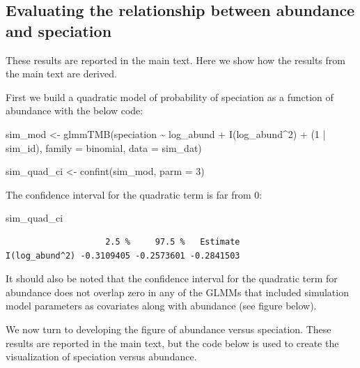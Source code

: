 \documentclass[
  letterpaper,
  DIV=11,
  numbers=noendperiod]{scrartcl}
\newenvironment{Shaded}{\begin{snugshade}}{\end{snugshade}}
\newcommand{\AttributeTok}[1]{\textcolor[rgb]{0.40,0.45,0.13}{#1}}
\newcommand{\DecValTok}[1]{\textcolor[rgb]{0.68,0.00,0.00}{#1}}
\newcommand{\FunctionTok}[1]{\textcolor[rgb]{0.28,0.35,0.67}{#1}}
\newcommand{\NormalTok}[1]{\textcolor[rgb]{0.00,0.23,0.31}{#1}}
\newcommand{\OtherTok}[1]{\textcolor[rgb]{0.00,0.23,0.31}{#1}}
\newcommand{\SpecialCharTok}[1]{\textcolor[rgb]{0.37,0.37,0.37}{#1}}
\begin{document}
\subsection{Evaluating the relationship between abundance and
speciation}\label{sec-sim-mod}

These results are reported in the main text. Here we show how the
results from the main text are derived.

First we build a quadratic model of probability of speciation as a
function of abundance with the below code:

\begin{Shaded}
\begin{Highlighting}[]
\NormalTok{sim\_mod }\OtherTok{\textless{}{-}} \FunctionTok{glmmTMB}\NormalTok{(speciation }\SpecialCharTok{\textasciitilde{}}\NormalTok{ log\_abund }\SpecialCharTok{+} \FunctionTok{I}\NormalTok{(log\_abund}\SpecialCharTok{\^{}}\DecValTok{2}\NormalTok{) }\SpecialCharTok{+}\NormalTok{ (}\DecValTok{1} \SpecialCharTok{|}\NormalTok{ sim\_id), }
                   \AttributeTok{family =}\NormalTok{ binomial, }\AttributeTok{data =}\NormalTok{ sim\_dat)}

\NormalTok{sim\_quad\_ci }\OtherTok{\textless{}{-}} \FunctionTok{confint}\NormalTok{(sim\_mod, }\AttributeTok{parm =} \DecValTok{3}\NormalTok{)}
\end{Highlighting}
\end{Shaded}

The confidence interval for the quadratic term is far from 0:

\begin{Shaded}
\begin{Highlighting}[]
\NormalTok{sim\_quad\_ci}
\end{Highlighting}
\end{Shaded}

\begin{verbatim}
                    2.5 %     97.5 %   Estimate
I(log_abund^2) -0.3109405 -0.2573601 -0.2841503
\end{verbatim}

It should also be noted that the confidence interval for the quadratic
term for abundance does not overlap zero in any of the GLMMs that
included simulation model parameters as covariates along with abundance
(see figure below).

We now turn to developing the figure of abundance versus speciation.
These results are reported in the main text, but the code below is used
to create the visualization of speciation versus abundance.
\end{document}
